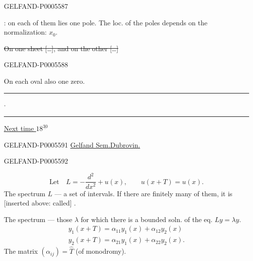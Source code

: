 \begin{GelfandAdjacentEvidence}{GELFAND-P000558}{7}


: on each of them lies one pole. The loc. of the poles depends on the normalization: \(x_0\).

\sout{On one sheet […], and on the other […]}
\end{GelfandAdjacentEvidence}
\begin{GelfandAdjacentEvidence}{GELFAND-P000558}{8}

\end{GelfandAdjacentEvidence}

On each oval also one zero.
\hfill\rule{1.4cm}{.35pt}\enspace\(\cdot\)\enspace\rule{1.4cm}{.35pt}\par
\uline{Next time \mbox{$18^{\underline{30}}$}}


\begin{GelfandAdjacentEvidence}{GELFAND-P000559}{1}
\noindent{}\qquad\underline{Gelfand Sem.}\qquad\underline{Dubrovin.}
\end{GelfandAdjacentEvidence}
\begin{GelfandAdjacentEvidence}{GELFAND-P000559}{2}

\[
\text{Let}\quad L=-\frac{d^2}{dx^2}+u(x),\qquad u(x+T)=u(x).
\]
The spectrum \(L\) — a set of intervals. If there are finitely many of them, it is [inserted above: called] .
\end{GelfandAdjacentEvidence}

The spectrum — those \(\lambda\) for which there is a bounded soln. of the eq. \underline{\(Ly=\lambda y\)}.
\begin{gather*}
y_1(x+T)=\alpha_{11}y_1(x)+\alpha_{12}y_2(x)\\
y_2(x+T)=\alpha_{21}y_1(x)+\alpha_{22}y_2(x).
\end{gather*}
The matrix \((\alpha_{ij})=\widehat T\) (of monodromy).

